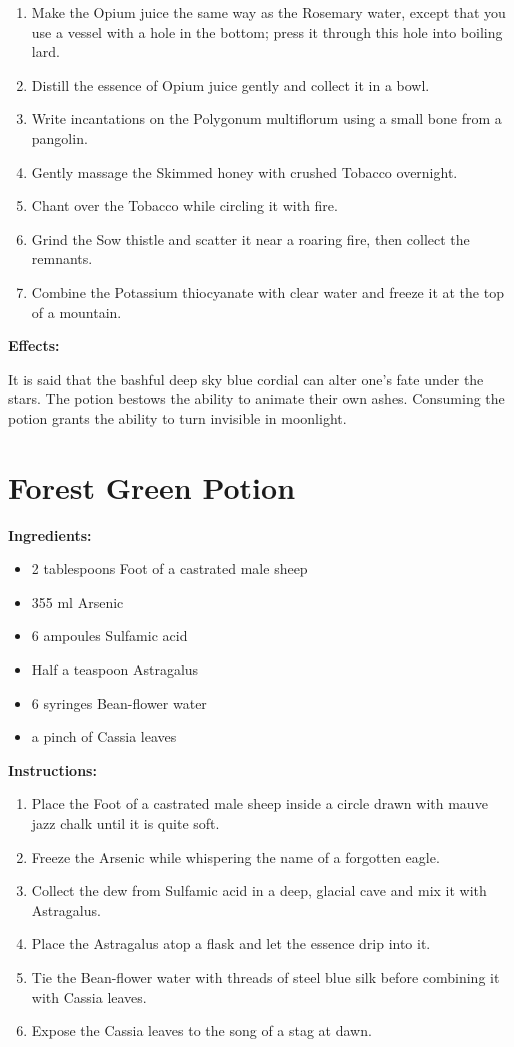 \documentclass{article}
\begin{document}
\begin{enumerate}
  \item Make the Opium juice the same way as the Rosemary water, except that you use a vessel with a hole in the bottom; press it through this hole into boiling lard.
  \item Distill the essence of Opium juice gently and collect it in a bowl.
  \item Write incantations on the Polygonum multiflorum using a small bone from a pangolin.
  \item Gently massage the Skimmed honey with crushed Tobacco overnight.
  \item Chant over the Tobacco while circling it with fire.
  \item Grind the Sow thistle and scatter it near a roaring fire, then collect the remnants.
  \item Combine the Potassium thiocyanate with clear water and freeze it at the top of a mountain.
\end{enumerate}

\textbf{Effects:}

It is said that the bashful deep sky blue cordial can alter one's fate under the stars. The potion bestows the ability to animate their own ashes. Consuming the potion grants the ability to turn invisible in moonlight.

\newpage
\section*{Forest Green Potion}

\textbf{Ingredients:}

\begin{itemize}
  \item 2 tablespoons Foot of a castrated male sheep
  \item 355 ml Arsenic
  \item 6 ampoules Sulfamic acid
  \item Half a teaspoon Astragalus
  \item 6 syringes Bean-flower water
  \item a pinch of Cassia leaves
\end{itemize}

\textbf{Instructions:}

\begin{enumerate}
  \item Place the Foot of a castrated male sheep inside a circle drawn with mauve jazz chalk until it is quite soft.
  \item Freeze the Arsenic while whispering the name of a forgotten eagle.
  \item Collect the dew from Sulfamic acid in a deep, glacial cave and mix it with Astragalus.
  \item Place the Astragalus atop a flask and let the essence drip into it.
  \item Tie the Bean-flower water with threads of steel blue silk before combining it with Cassia leaves.
  \item Expose the Cassia leaves to the song of a stag at dawn.
\end{enumerate}
\end{document}

